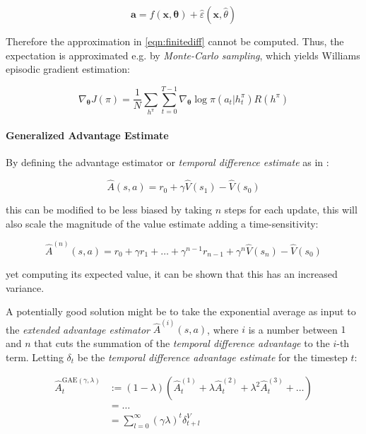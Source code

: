 \begin{equation}
    \mathbf{a} = f(\mathbf{x}, \boldsymbol{\theta}) + \hat{\varepsilon}(\mathbf{x}, \hat{\theta})
\end{equation}


Therefore the approximation in \ref{eqn:finitediff} cannot be computed. Thus, the expectation is approximated e.g. by \textit{Monte-Carlo sampling}, which yields Williams \cite{williams_simple_1992} episodic gradient estimation:

\begin{equation}
    \nabla _{\boldsymbol{\theta}} J(\pi) = \frac{1}{N} \sum _{h^{\pi}} \sum ^{T-1} _{t = 0} \nabla _{\boldsymbol{\theta}} \log \pi(a _t | h _t ^{\pi}) R(h ^{\pi})
\end{equation}


\paragraph{Generalized Advantage Estimate}
By defining the advantage estimator or \textit{temporal difference estimate} as in \cite{schulman_high-dimensional_2018}:

\begin{equation}
    \hat{A}(s,a) = r _0 + \gamma \hat{V}(s _1) - \hat{V}(s _0)
\end{equation}

this can be modified to be less biased by taking $n$ steps for each update, this will also scale the magnitude of the value estimate adding a time-sensitivity:

\begin{equation}
    \hat{A} ^{(n)} (s,a) = r _0 + \gamma r _1 + \dots + \gamma ^{n-1} r _{n-1} + \gamma ^n \hat{V}(s _n) - \hat{V}(s _0)
\end{equation}

yet computing its expected value, it can be shown that this has an increased variance.

A potentially good solution might be to take the exponential average as input to the \textit{extended advantage estimator} $\hat{A} ^{(i)}(s, a) $, where $i$ is a number between $1$ and $n$ that cuts the summation of the \textit{temporal difference advantage} to the $i$-th term. Letting $\delta _t$ be the \textit{temporal difference advantage estimate} for the timestep $t$:

\begin{align}
    \hat{A} _t ^{\text{GAE} (\gamma, \lambda)} & := (1 - \lambda)(\hat{A} _t ^{(1)} + \lambda \hat{A} _t ^{(2)} + \lambda ^2 \hat{A} _t ^{(3)} + \dots) \\
                                               & = \dots \nonumber                                                                                      \\
                                               & = \sum ^{ \infty } _{l = 0} (\gamma \lambda) ^t \delta ^V _{t+l} \nonumber
\end{align}

